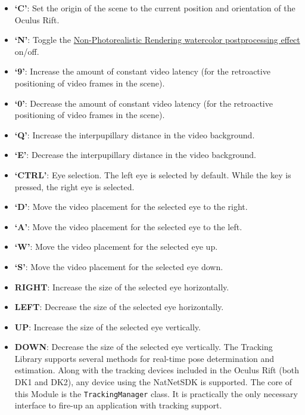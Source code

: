 \documentclass[]{article}
\begin{document}
\begin{itemize}
\itemsep1pt\parskip0pt
\item
  \textbf{`C'}: Set the origin of the scene to the current position and
  orientation of the Oculus Rift.
\item
  \textbf{`N'}: Toggle the
  \href{https://github.com/ands/OculusMeetsAR/wiki/Postprocessing}{Non-Photorealistic
  Rendering watercolor postprocessing effect} on/off.
\item
  \textbf{`9'}: Increase the amount of constant video latency (for the
  retroactive positioning of video frames in the scene).
\item
  \textbf{`0'}: Decrease the amount of constant video latency (for the
  retroactive positioning of video frames in the scene).
\item
  \textbf{`Q'}: Increase the interpupillary distance in the video
  background.
\item
  \textbf{`E'}: Decrease the interpupillary distance in the video
  background.
\item
  \textbf{`CTRL'}: Eye selection. The left eye is selected by default.
  While the key is pressed, the right eye is selected.
\item
  \textbf{`D'}: Move the video placement for the selected eye to the
  right.
\item
  \textbf{`A'}: Move the video placement for the selected eye to the
  left.
\item
  \textbf{`W'}: Move the video placement for the selected eye up.
\item
  \textbf{`S'}: Move the video placement for the selected eye down.
\item
  \textbf{RIGHT}: Increase the size of the selected eye horizontally.
\item
  \textbf{LEFT}: Decrease the size of the selected eye horizontally.
\item
  \textbf{UP}: Increase the size of the selected eye vertically.
\item
  \textbf{DOWN}: Decrease the size of the selected eye vertically. The
  Tracking Library supports several methods for real-time pose
  determination and estimation. Along with the tracking devices included
  in the Oculus Rift (both DK1 and DK2), any device using the NatNetSDK
  is supported. The core of this Module is the \texttt{TrackingManager}
  class. It is practically the only necessary interface to fire-up an
  application with tracking support.
\end{itemize}
\end{document}
